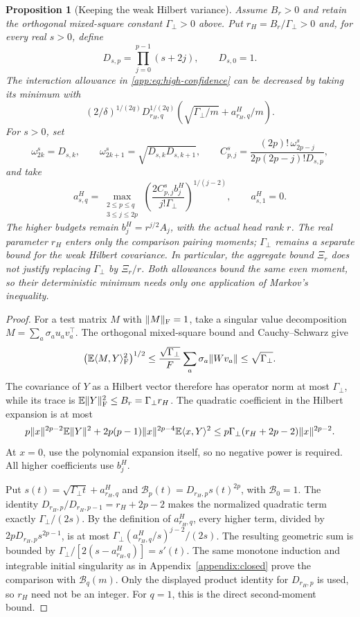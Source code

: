 \documentclass[11pt,a4paper]{article}
\newtheorem{proposition}[theorem]{Proposition}
\theoremstyle{definition}\newtheorem{definition}[theorem]{Definition}
\theoremstyle{remark}\newtheorem{remark}[theorem]{Remark}
\numberwithin{equation}{section}
\newcommand{\norm}[1]{\lVert#1\rVert}\newcommand{\ip}[2]{\langle#1,#2\rangle}
\begin{document}
\begin{proposition}[Keeping the weak Hilbert variance]
\label{app:prop:radial-hilbert}
Assume $B_r>0$ and retain the orthogonal mixed-square constant
$\Gamma_{\perp}>0$ above. Put $r_H=B_r/\Gamma_{\perp}>0$ and, for every real $s>0$,
define
\[
 D_{s,p}=\prod_{j=0}^{p-1}(s+2j),\qquad D_{s,0}=1.
\]
The interaction allowance in \eqref{app:eq:high-confidence} can be
decreased by taking its minimum with
\begin{equation}\label{app:eq:radial-hilbert}
 (2/\delta)^{1/(2q)}D_{r_H,q}^{1/(2q)}
       \left(\sqrt{\Gamma_{\perp}/m}+a_{r_H,q}^H/m\right).
\end{equation}
For $s>0$, set
\[
 \omega^s_{2k}=D_{s,k},\qquad
 \omega^s_{2k+1}=\sqrt{D_{s,k}D_{s,k+1}},\qquad
 C^s_{p,j}=\frac{(2p)!\,\omega^s_{2p-j}}
                    {2p(2p-j)!D_{s,p}},
\]
and take
\[
 a_{s,q}^H=\max_{\substack{2\le p\le q\\3\le j\le2p}}
    \left(\frac{2C^s_{p,j}b_j^H}{j!\Gamma_{\perp}}\right)^{1/(j-2)},
 \qquad a_{s,1}^H=0.
\]
The higher budgets remain $b_j^H=r^{j/2}A_j$, with the actual head
rank $r$. The real parameter $r_H$ enters only the comparison
pairing moments; $\Gamma_{\perp}$ remains a separate bound for the weak
Hilbert covariance. In particular, the aggregate bound $\Xi_r$
does not justify replacing $\Gamma_{\perp}$ by $\Xi_r/r$.
Both allowances bound the same even moment, so their deterministic
minimum needs only one application of Markov's inequality.
\end{proposition}
\begin{proof}
For a test matrix $M$ with $\norm M_\F=1$, take a singular value
decomposition $M=\sum_a\sigma_a u_av_a^\top$. The orthogonal
mixed-square bound and Cauchy--Schwarz give
\[
 \bigl(\E\ip M Y_\F^2\bigr)^{1/2}
 \le\frac{\sqrt{\Gamma_{\perp}}}{F}\sum_a\sigma_a\norm{Wv_a}
 \le\sqrt{\Gamma_{\perp}}.
\]
The covariance of $Y$ as a Hilbert vector therefore has operator
norm at most $\Gamma_{\perp}$, while its trace is
$\E\norm Y_\F^2\le B_r=\Gamma_{\perp} r_H$.
The quadratic coefficient in the Hilbert expansion is at most
\[
 p\norm x^{2p-2}\E\norm Y^2
 +2p(p-1)\norm x^{2p-4}\E\ip xY^2
 \le p\Gamma_{\perp}(r_H+2p-2)\norm x^{2p-2}.
\]
At $x=0$, use the polynomial expansion itself, so no negative
power is required. All higher coefficients use $b_j^H$.

Put $s(t)=\sqrt{\Gamma_{\perp} t}+a_{r_H,q}^H$ and
$\mathcal B_p(t)=D_{r_H,p}s(t)^{2p}$, with $\mathcal B_0=1$.
The identity $D_{r_H,p}/D_{r_H,p-1}=r_H+2p-2$ makes the normalized
quadratic term exactly $\Gamma_{\perp}/(2s)$.
By the definition of $a_{r_H,q}^H$, every higher term, divided by
$2pD_{r_H,p}s^{2p-1}$, is at most
$\Gamma_{\perp}(a_{r_H,q}^H/s)^{j-2}/(2s)$.
The resulting geometric sum is bounded by
$\Gamma_{\perp}/[2(s-a_{r_H,q}^H)]=s'(t)$.
The same monotone induction and integrable initial singularity as
in Appendix~\ref{appendix:closed} prove the comparison with
$\mathcal B_q(m)$. Only the displayed product identity for
$D_{r_H,p}$ is used, so $r_H$ need not be an integer.
For $q=1$, this is the direct second-moment bound.
\end{proof}
\end{document}
